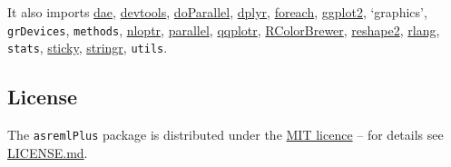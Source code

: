\documentclass[
]{article}
\begin{document}
It also imports \href{https://CRAN.R-project.org/package=dae}{dae},
\href{https://CRAN.R-project.org/package=devtools}{devtools},
\href{https://CRAN.R-project.org/package=doParallel}{doParallel},
\href{https://CRAN.R-project.org/package=dplyr}{dplyr},
\href{https://CRAN.R-project.org/package=foreach}{foreach},
\href{https://CRAN.R-project.org/package=ggplot2}{ggplot2}, `graphics',
\texttt{grDevices}, \texttt{methods},
\href{https://CRAN.R-project.org/package=nloptr}{nloptr},
\href{https://CRAN.R-project.org/package=parallel}{parallel},
\href{https://CRAN.R-project.org/package=qqplotr}{qqplotr},
\href{https://CRAN.R-project.org/package=RColorBrewer}{RColorBrewer},
\href{https://CRAN.R-project.org/package=reshape}{reshape2},
\href{https://CRAN.R-project.org/package=rlang}{rlang}, \texttt{stats},
\href{https://CRAN.R-project.org/package=sticky}{sticky},
\href{https://CRAN.R-project.org/package=stringr}{stringr},
\texttt{utils}.

\subsection{License}\label{license}

The \texttt{asremlPlus} package is distributed under the
\href{https://opensource.org/licenses/MIT}{MIT licence} -- for details
see
\href{https://github.com/briencj/asremlPlus/blob/master/LICENSE.md}{LICENSE.md}.
\end{document}
